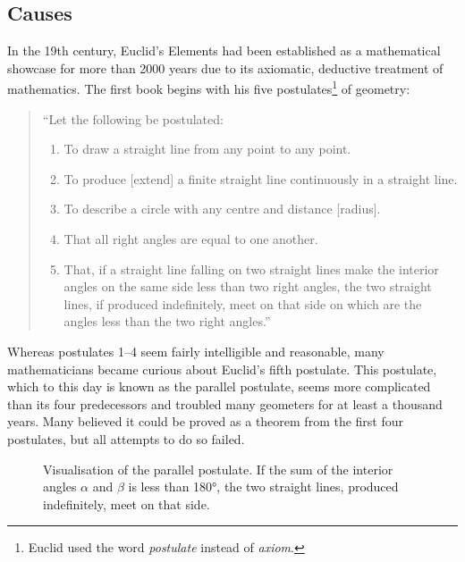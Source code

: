 \documentclass[hidelinks]{article}
\begin{document}
\subsection{Causes}\label{ssec_causes}
In the 19th century, Euclid's Elements had been established as a mathematical showcase for more than 2000 years due to its axiomatic, deductive treatment of mathematics. The first book begins with his five postulates\footnote{Euclid used the word \textit{postulate} instead of \textit{axiom}.} of geometry:

\begin{quote}
``Let the following be postulated:
\begin{enumerate}
\item To draw a straight line from any point to any point.
\item To produce [extend] a finite straight line continuously in a straight line.
\item To describe a circle with any centre and distance [radius].
\item That all right angles are equal to one another.
\item That, if a straight line falling on two straight lines make the interior angles on the same side less than two right angles, the two straight lines, if produced indefinitely, meet on that side on which are the angles less than the two right angles.''
\end{enumerate}
\end{quote}

Whereas postulates 1--4 seem fairly intelligible and reasonable, many mathematicians became curious about Euclid's fifth postulate. This postulate, which to this day is known as the parallel postulate, seems more complicated than its four predecessors and troubled many geometers for at least a thousand years. Many believed it could be proved as a theorem from the first four postulates, but all attempts to do so failed. 

\begin{figure}[h]
	\centering
{}
	\caption{Visualisation of the parallel postulate. If the sum of the interior angles $\alpha$ and $\beta$ is less than 180°, the two straight lines, produced indefinitely, meet on that side.}
\end{figure}
\end{document}

